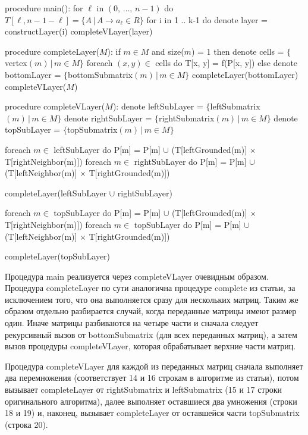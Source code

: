 \documentclass[12pt]{article}  %
\theoremstyle{definition}
\theoremstyle{remark}
\begin{document}
\begin{algorithm}[caption={Algorithm.}, label={main}]
procedure main():
  for $\ell$ in $(0,\,\dots,\,n-1)$ do
    $T[\ell, n-1-\ell] = \{A\,|\,A \to a_{\ell} \in R\}$
  for i in 1 .. k-1 do
    denote layer = constructLayer(i)
    completeVLayer(layer)  

procedure completeLayer($M$):
  if $m \in M$ and size($m$) = 1 then
    denote cells = $\{$vertex$(m)\,|\, m \in M\}$
    foreach $(x, y) \in $ cells do
      T[x, y] = f(P[x, y])
  else
    denote bottomLayer = $\{$bottomSubmatrix$(m)\,|\,m \in M\}$
    completeLayer(bottomLayer)
    completeVLayer($M$)     

procedure completeVLayer($M$):
  denote leftSubLayer = $\{$leftSubmatrix$(m)\,|\,m \in M\}$
  denote rightSubLayer = $\{$rightSubmatrix$(m)\,|\,m \in M\}$
  denote topSubLayer = $\{$topSubmatrix$(m)\,|\,m \in M\}$

  foreach $m \in$ leftSubLayer do
    P[m] = P[m] $\cup$ (T[leftGrounded(m)] $\times$ T[rightNeighbor(m)])
  foreach $m \in$ rightSubLayer do
    P[m] = P[m] $\cup$ (T[leftNeighbor(m)] $\times$ T[rightGrounded(m)])

  completeLayer(leftSubLayer $\cup$ rightSubLayer)

  foreach $m \in$ topSubLayer do
    P[m] = P[m] $\cup$ (T[leftGrounded(m)] $\times$ T[rightNeighbor(m)])
  foreach $m \in$ topSubLayer do
    P[m] = P[m] $\cup$ (T[leftNeighbor(m)] $\times$ T[rightGrounded(m)])

  completeLayer(topSubLayer)  
\end{algorithm}

Процедура main реализуется через completeVLayer очевидным образом. Процедура completeLayer по сути аналогична процедуре complete из статьи, за исключением того, что она выполняется сразу для нескольких матриц. Таким же образом отдельно разбирается случай, когда переданные матрицы имеют размер один. Иначе матрицы разбиваются на четыре части и сначала следует рекурсивный вызов от bottomSubmatrix (для всех переданных матриц), а затем вызов процедуры completeVLayer, которая обрабатывает верхние части матриц. 

Процедура completeVLayer для каждой из переданных матриц сначала выполняет два перемножения (соответствует 14 и 16 строкам в алгоритме из статьи), потом вызывает completeLayer от rightSubmatrix и leftSubmatrix (15 и 17 строки оригинального алгоритма), далее выполняет оставшиеся два умножения (строки 18 и 19) и, наконец, вызывает completeLayer от оставшейся части topSubmatrix (строка 20).
\end{document}
